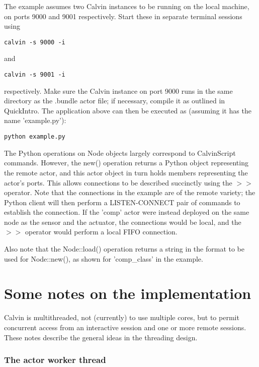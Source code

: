 \documentclass[10pt, a4paper]{article}
\begin{document}
The example assumes two Calvin instances to be running on the local
machine, on ports 9000 and 9001 respectively. Start these in separate
terminal sessions using

\begin{verbatim}
calvin -s 9000 -i
\end{verbatim}

and

\begin{verbatim}
calvin -s 9001 -i
\end{verbatim}

respectively. Make sure the Calvin instance on port 9000 runs in the
same directory as the .bundle actor file; if necessary, compile it as
outlined in QuickIntro. The application above can then be executed as
(assuming it has the name 'example.py'):

\begin{verbatim}
python example.py
\end{verbatim}

The Python operations on Node objects largely correspond to
CalvinScript commands. However, the new() operation returns a Python
object representing the remote actor, and this actor object in turn
holds members representing the actor's ports. This allows connections
to be described succinctly using the $>>$ operator. Note that the
connections in the example are of the remote variety; the Python
client will then perform a LISTEN-CONNECT pair of commands to
establish the connection. If the 'comp' actor were instead deployed on
the same node as the sensor and the actuator, the connections would be
local, and the $>>$ operator would perform a local FIFO connection.

Also note that the Node::load() operation returns a string in the
format to be used for Node::new(), as shown for 'comp\_class' in the
example.

\section{Some notes on the implementation}

Calvin is multithreaded, not (currently) to use multiple cores, but to
permit concurrent access from an interactive session and one or more
remote sessions. These notes describe the general ideas in the
threading design.

\subsubsection*{The actor worker thread}
\end{document}
